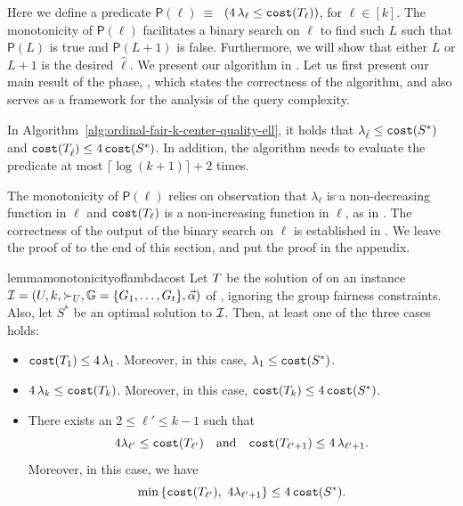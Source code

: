 \documentclass{article}
\begin{document}
Here we define a predicate $\mathsf{P}(\ell) ~\equiv~$ $( 4\,\lambda_{\ell} \leq \texttt{cost}(T_{\ell}))$, for $\ell\in[k]$. 
The monotonicity of $\mathsf{P}(\ell)$ facilitates a binary search on $\ell$ to find such $L$ such that $\mathsf{P}(L)$ is true and $\mathsf{P}(L+1)$ is false.
Furthermore, we will show that either $L$ or $L+1$ is the desired $\hat{\ell}$. 
We present our algorithm in . 
Let us first present our main result of the phase, , which states the correctness of the algorithm, and also serves as a framework for the analysis of the query complexity.


\begin{theorem}
    \label{lemma:binary-search-on-ell}
    In Algorithm~\ref{alg:ordinal-fair-k-center-quality-ell}, it holds that $\lambda_{\hat{\ell}} \leq \texttt{cost}(S^*)$ and $\texttt{cost}(T_{\hat{\ell}}) \leq 4\, \texttt{cost}(S^*)$.
    In addition, the algorithm needs to evaluate the predicate at most $\lceil \log(k+1) \rceil +2$ times.
\end{theorem}


The monotonicity of $\mathsf{P}(\ell)$ relies on observation that $\lambda_{\ell}$ is a non-decreasing function in $\ell$ and $\texttt{cost}(T_{\ell})$ is a non-increasing function in $\ell$, as in .
The correctness of the output of the binary search on $\ell$ is established in .
We leave the proof of  to the end of this section, and put the proof  in the appendix. 


\begin{restatable}{lemma}{monotonicityoflambdacost}
    \label{lemma:monotonicity-of-lambda-and-cost-init-sol-set}
    Let $T$ be the solution of \bcfrss on an instance $\mathcal{I}=(U,k, \succ_U, \mathbb{G}=\{G_1,\dots,G_t\},\vec{\alpha})$ of \ordfairkcen, ignoring the group fairness constraints. Also, let $S^*$ be an optimal solution to $\mathcal{I}$. 
    Then, at least one of the three cases  holds:
\begin{itemize}
    \item[\textbf{(a)}] $\texttt{cost}(T_{1}) \leq 4\,\lambda_{1}$. Moreover, in this case, $\lambda_{1} \leq \texttt{cost}(S^*)$. 
    \item[\textbf{(b)}] $4\,\lambda_{k} \leq \texttt{cost}(T_{k})$. Moreover, in this case, $\texttt{cost}(T_{k}) \leq 4\,\texttt{cost}(S^*)$. 
    \item[\textbf{(c)}] There exists an $2 \leq \ell' \leq k-1$ such that
    \[
        4\lambda_{\ell'} \leq \texttt{cost}(T_{\ell'})
        \quad \text{and} \quad
        \texttt{cost}(T_{\ell'+1}) \leq 4\, \lambda_{\ell'+1}.
    \]
    Moreover, in this case, we have
    \[
        \min \left\{ \texttt{cost}(T_{\ell'}),~ 4\lambda_{\ell'+1} \right\} \leq 4\,\texttt{cost}(S^*).
    \]
\end{itemize}
\end{restatable}
\end{document}
